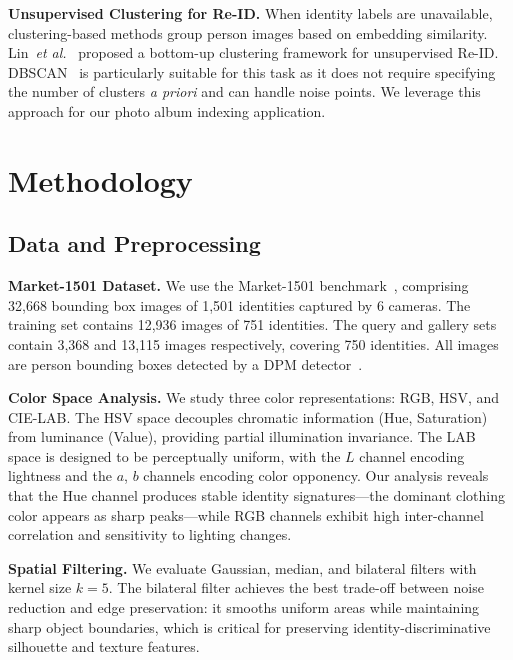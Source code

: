 \documentclass[final]{cvpr}
\begin{document}
\textbf{Unsupervised Clustering for Re-ID.}
When identity labels are unavailable, clustering-based methods group person images based on embedding similarity.
Lin~\emph{et al.}~\cite{lin2019bottom} proposed a bottom-up clustering framework for unsupervised Re-ID.
DBSCAN~\cite{ester1996dbscan} is particularly suitable for this task as it does not require specifying the number of clusters \emph{a priori} and can handle noise points.
We leverage this approach for our photo album indexing application.

\section{Methodology}

\subsection{Data and Preprocessing}

\textbf{Market-1501 Dataset.}
We use the Market-1501 benchmark~\cite{zheng2015market}, comprising 32,668 bounding box images of 1,501 identities captured by 6 cameras.
The training set contains 12,936 images of 751 identities.
The query and gallery sets contain 3,368 and 13,115 images respectively, covering 750 identities.
All images are person bounding boxes detected by a DPM detector~\cite{felzenszwalb2010dpm}.

\textbf{Color Space Analysis.}
We study three color representations: RGB, HSV, and CIE-LAB.
The HSV space decouples chromatic information (Hue, Saturation) from luminance (Value), providing partial illumination invariance.
The LAB space is designed to be perceptually uniform, with the $L$ channel encoding lightness and the $a$, $b$ channels encoding color opponency.
Our analysis reveals that the Hue channel produces stable identity signatures---the dominant clothing color appears as sharp peaks---while RGB channels exhibit high inter-channel correlation and sensitivity to lighting changes.

\textbf{Spatial Filtering.}
We evaluate Gaussian, median, and bilateral filters with kernel size $k=5$.
The bilateral filter achieves the best trade-off between noise reduction and edge preservation: it smooths uniform areas while maintaining sharp object boundaries, which is critical for preserving identity-discriminative silhouette and texture features.
\end{document}
